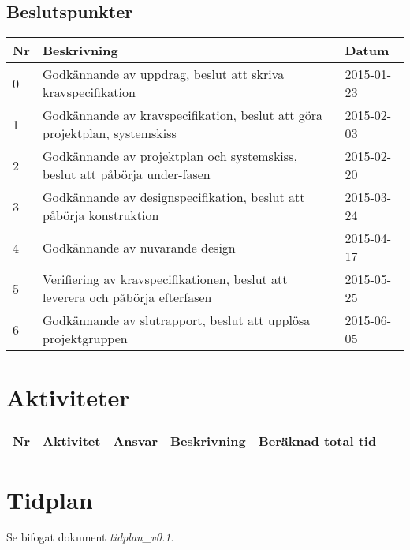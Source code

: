 \documentclass[11pt]{article}
\begin{document}
\begin{flushleft}
\subsection{Beslutspunkter}
\begin{table}[h]
\begin{tabular}{|l|p{.75\linewidth}|l|} \hline

Nr &
Beskrivning &
Datum \\ \hline

0 &
Godkännande av uppdrag, beslut att skriva kravspecifikation &
2015-01-23 \\ \hline
1 &
Godkännande av kravspecifikation, beslut att göra projektplan, systemskiss &
2015-02-03 \\ \hline
2 &
Godkännande av projektplan och systemskiss, beslut att påbörja under-fasen &
2015-02-20 \\ \hline
3 &
Godkännande av designspecifikation, beslut att påbörja konstruktion &
2015-03-24 \\ \hline
4 &
Godkännande av nuvarande design &
2015-04-17 \\ \hline
5 &
Verifiering av kravspecifikationen, beslut att leverera och påbörja efterfasen &
2015-05-25 \\ \hline
6 &
Godkännande av slutrapport, beslut att upplösa projektgruppen &
2015-06-05 \\ \hline
 
\end{tabular}
\end{table}

\pagebreak

\section{Aktiviteter}
\begin{table}[h]
\begin{tabular}{|l|p{.30\linewidth}|l|p{.40\linewidth}|p{.10\linewidth}|} \hline

Nr & 
Aktivitet & 
Ansvar & 
Beskrivning & 
Beräknad total tid \\[0.1in] \hline




\end{tabular}
\end{table}


\section{Tidplan}
Se bifogat dokument \textit{tidplan\_v0.1}.


\end{flushleft}
\end{document}
